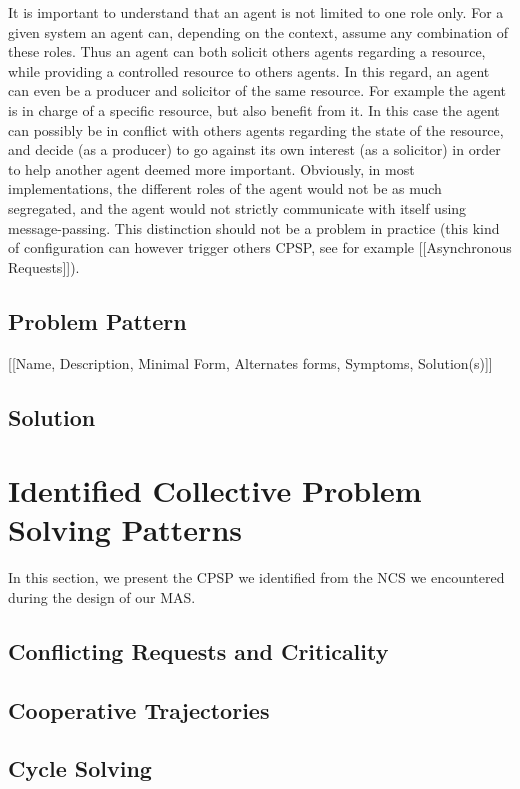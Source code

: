 It is important to understand that an agent is not limited to one role only. For a given system an agent can, depending on the context, assume any combination of these roles. Thus an agent can both solicit others agents regarding a resource, while providing a controlled resource to others agents.
In this regard, an agent can even be a producer and solicitor of the same resource. For example the agent is in charge of a specific resource, but also benefit from it. In this case the agent can possibly be in conflict with others agents regarding the state of the resource, and decide (as a producer) to go against its own interest (as a solicitor) in order to help another agent deemed more important.
Obviously, in most implementations, the different roles of the agent would not be as much segregated, and the agent would not strictly communicate with itself using message-passing. This distinction should not be a problem in practice (this kind of configuration can however trigger others CPSP, see for example [[Asynchronous Requests]]).

\subsection{Problem Pattern}

[[Name, Description, Minimal Form, Alternates forms, Symptoms, Solution(s)]]

\subsection{Solution}

\section{Identified Collective Problem Solving Patterns}

In this section, we present the CPSP we identified from the NCS we encountered during the design of our MAS.

\subsection{Conflicting Requests and Criticality}

\subsection{Cooperative Trajectories}

\subsection{Cycle Solving}

